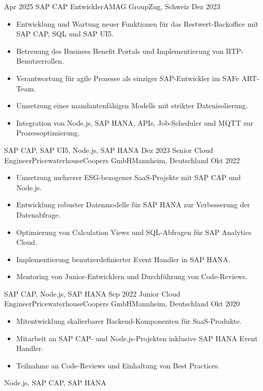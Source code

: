 \begin{experiences}
\experience
  {Apr 2025}
  {SAP CAP Entwickler}{AMAG Group}{Zug, Schweiz}
  {Dez 2023}
  {
    \begin{itemize}
      \item Entwicklung und Wartung neuer Funktionen f\"ur das Restwert-Backoffice mit SAP CAP, SQL und SAP UI5.
      \item Betreuung des Business Benefit Portals und Implementierung von BTP-Benutzerrollen.
      \item Verantwortung f\"ur agile Prozesse als einziger SAP-Entwickler im SAFe ART-Team.
      \item Umsetzung eines mandantenf\"ahigen Modells mit strikter Datenisolierung.
      \item Integration von Node.js, SAP HANA, APIs, Job-Scheduler und MQTT zur Prozessoptimierung.
    \end{itemize}
  }
  {SAP CAP, SAP UI5, Node.js, SAP HANA}
\emptySeparator
\experience
  {Dez 2023}
  {Senior Cloud Engineer}{PricewaterhouseCoopers GmbH}{Mannheim, Deutschland}
  {Okt 2022}
  {
    \begin{itemize}
      \item Umsetzung mehrerer ESG-bezogener SaaS-Projekte mit SAP CAP und Node.js.
      \item Entwicklung robuster Datenmodelle f\"ur SAP HANA zur Verbesserung der Datenabfrage.
      \item Optimierung von Calculation Views und SQL-Abfragen f\"ur SAP Analytics Cloud.
      \item Implementierung benutzerdefinierter Event Handler in SAP HANA.
      \item Mentoring von Junior-Entwicklern und Durchf\"uhrung von Code-Reviews.
    \end{itemize}
  }
  {SAP CAP, Node.js, SAP HANA}
\emptySeparator
\experience
  {Sep 2022}
  {Junior Cloud Engineer}{PricewaterhouseCoopers GmbH}{Mannheim, Deutschland}
  {Okt 2020}
  {
    \begin{itemize}
      \item Mitentwicklung skalierbarer Backend-Komponenten f\"ur SaaS-Produkte.
      \item Mitarbeit an SAP CAP- und Node.js-Projekten inklusive SAP HANA Event Handler.
      \item Teilnahme an Code-Reviews und Einhaltung von Best Practices.
    \end{itemize}
  }
  {Node.js, SAP CAP, SAP HANA}

\end{experiences}
